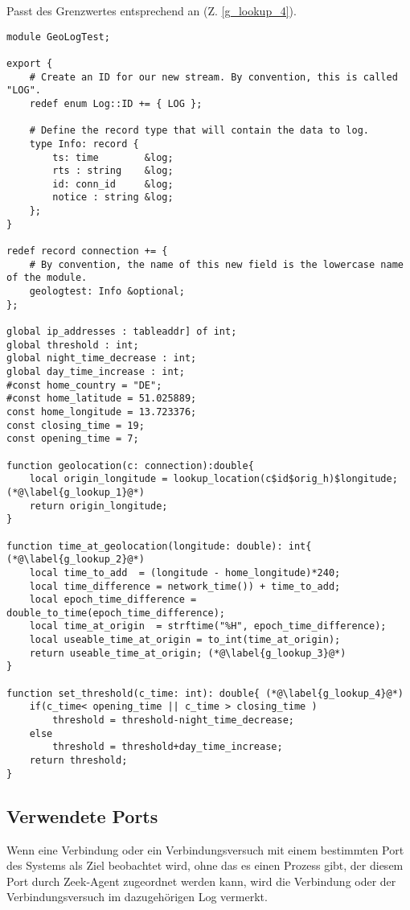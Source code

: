 Passt des Grenzwertes entsprechend an (Z. \ref{g_lookup_4}).\\\pagebreak
{}
\begin{lstlisting}[consecutivenumbers=false,numberblanklines=false,label={Code_3},caption={Geolokalisierung und Setzen des Grenzwertes},firstnumber=31,linerange={31-37,42-54}]
module GeoLogTest;

export {
    # Create an ID for our new stream. By convention, this is called "LOG".
    redef enum Log::ID += { LOG };

    # Define the record type that will contain the data to log.
    type Info: record {
        ts: time        &log;
        rts : string 	&log;
        id: conn_id     &log; 
        notice : string &log;
    };
}

redef record connection += {
    # By convention, the name of this new field is the lowercase name of the module.
    geologtest: Info &optional;
};

global ip_addresses : tableaddr] of int;
global threshold : int; 
global night_time_decrease : int;
global day_time_increase : int;
#const home_country = "DE";
#const home_latitude = 51.025889;
const home_longitude = 13.723376;
const closing_time = 19;
const opening_time = 7;

function geolocation(c: connection):double{
	local origin_longitude = lookup_location(c$id$orig_h)$longitude;(*@\label{g_lookup_1}@*)
	return origin_longitude;
}

function time_at_geolocation(longitude: double): int{ (*@\label{g_lookup_2}@*)
	local time_to_add  = (longitude - home_longitude)*240;
	local time_difference = network_time()) + time_to_add;
	local epoch_time_difference = double_to_time(epoch_time_difference);
	local time_at_origin  = strftime("%H", epoch_time_difference);
	local useable_time_at_origin = to_int(time_at_origin);
	return useable_time_at_origin; (*@\label{g_lookup_3}@*)
}

function set_threshold(c_time: int): double{ (*@\label{g_lookup_4}@*)
	if(c_time< opening_time || c_time > closing_time )
		threshold = threshold-night_time_decrease;
	else 
		threshold = threshold+day_time_increase;
	return threshold; 
}
\end{lstlisting}

\subsection{Verwendete Ports}
Wenn eine Verbindung oder ein Verbindungsversuch mit einem bestimmten Port des Systems als Ziel beobachtet wird, ohne das es einen Prozess gibt, der diesem Port durch Zeek-Agent zugeordnet werden kann, wird die Verbindung oder der Verbindungsversuch im dazugehörigen Log vermerkt.\\

